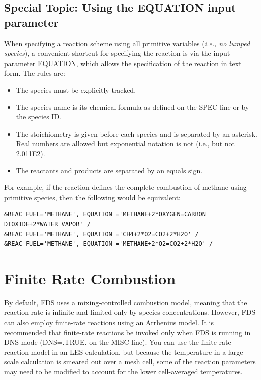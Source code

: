 \documentclass[11pt]{book}
\begin{document}
\subsection{Special Topic: Using the {\ct EQUATION} input parameter}
\label{info:EQUATION}

When specifying a reaction scheme using all primitive variables ({\em i.e., no lumped species}), a convenient shortcut for specifying the reaction is via the input parameter {\ct EQUATION}, which allows the specification of the reaction in text form.  The rules are:

\begin{itemize}
\item The species must be explicitly tracked.
\item The species name is its chemical formula as defined on the {\ct SPEC} line or by the species {\ct ID}.
\item The stoichiometry is given before each species and is separated by an asterisk. Real numbers are allowed but exponential notation is not (i.e., {} but not {\ct 2.011E2}).
\item The reactants and products are separated by an equals sign.
\end{itemize}

\noindent For example, if the reaction defines the complete combustion of methane using primitive species, then the following would be equivalent:

\begin{lstlisting}
&REAC FUEL='METHANE', EQUATION ='METHANE+2*OXYGEN=CARBON DIOXIDE+2*WATER VAPOR' /
&REAC FUEL='METHANE', EQUATION ='CH4+2*O2=CO2+2*H2O' /
&REAC FUEL='METHANE', EQUATION ='METHANE+2*O2=CO2+2*H2O' /
\end{lstlisting}



\newpage

\section{Finite Rate Combustion}
\label{info:finite}

By default, FDS uses a mixing-controlled combustion model, meaning that the reaction rate is infinite and limited only by species concentrations. However, FDS can also employ finite-rate reactions using an Arrhenius model. It is recommended that finite-rate reactions be invoked only when FDS is running in DNS mode ({\ct DNS=.TRUE.} on the {\ct MISC} line). You can use the finite-rate reaction model in an LES calculation, but because the temperature in a large scale calculation is smeared out over a mesh cell, some of the reaction parameters may need to be modified to account for the lower cell-averaged temperatures.
\end{document}

